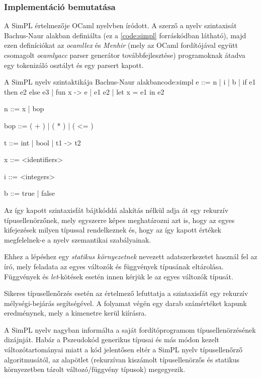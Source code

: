 \subsubsection{Implementáció bemutatása}

A SimPL értelmezője OCaml nyelvben íródott. A szerző a nyelv szintaxisát Bachus-Naur alakban definiálta (ez a \ref{code:simpl} forráskódban látható), majd ezen definíciókat az \textit{ocamllex} és \textit{Menhir} (mely az OCaml fordítójával együtt csomagolt \textit{ocamlyacc} parser generátor továbbfejlesztése) programoknak átadva egy tokenizáló osztályt és egy parsert kapott.

\begin{code}{A SimPL nyelv szintaktikája Bachus-Naur alakban}{code:simpl}
e ::= n | i | b
    | if e1 then e2 else e3
    | fun x -> e
    | e1 e2
    | let x = e1 in e2 

n ::= x | bop

bop ::= ( + ) | ( * ) | ( <= )

t ::= int | bool | t1 -> t2

x ::= <identifiers>

i ::= <integers>

b ::= true | false
\end{code}

Az így kapott szintaxisfát bájtkóddá alakítás nélkül adja át egy rekurzív típusellenörzőnek, mely egyszerre képes meghatározni azt is, hogy az egyes kifejezések milyen típussal rendelkeznek és, hogy az így kapott értékek megfelelnek-e a nyelv szemantikai szabályainak.

Ehhez a lépéshez egy \textit{statikus környezetnek} nevezett adatszerkezetet használ fel az író, mely feladata az egyes változók és függvények típusának eltárolása. Függvények és \textit{let}-kötések esetén innen kérjük le az egyes változók típusát.

Sikeres típusellenőrzés esetén az értelmező lefuttatja a szintaxisfát egy rekurzív mélységi-bejárás segítségével. A folyamat végén egy darab számértéket kapunk eredménynek, mely a kimenetre kerül kiírásra.

A SimPL nyelv nagyban informálta a saját fordítóprogramom típusellenörzésének dizájnját. Habár a Pszeudokód generikus típusai és más módon kezelt változótartományai miatt a kód jelentősen eltér a SimPL nyelv típusellenőrző algoritmusától, az alapötlet (rekurzívan kiszámolt típusellenörzős és statikus környezetben tárolt változó/függvény típusok) megegyezik.
